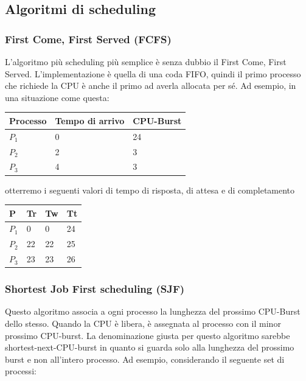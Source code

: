 \documentclass[a4paper]{article}
\begin{document}
\subsection{Algoritmi di scheduling}

\subsubsection{First Come, First Served (FCFS)}
L'algoritmo più scheduling più semplice è senza dubbio il First Come, First Served. L'implementazione è quella di una coda FIFO, quindi il primo processo che richiede la CPU è anche il primo ad averla allocata per sé.\newline
Ad esempio, in una situazione come questa:

\begin{table}[htb]
    \centering
    \label{my-label}
    \begin{tabular}{lll}
        Processo & Tempo di arrivo & CPU-Burst \\ \hline
        $P_1$    & 0               & 24        \\
        $P_2$    & 2               & 3         \\
        $P_3$    & 4               & 3
    \end{tabular}
\end{table}

otterremo i seguenti valori di tempo di risposta, di attesa e di completamento

\begin{table}[htb]
    \centering
    \label{my-label}
    \begin{tabular}{llll}
        P     & Tr & Tw & Tt \\ \hline
        $P_1$ & 0  & 0  & 24 \\
        $P_2$ & 22 & 22 & 25 \\
        $P_3$ & 23 & 23 & 26
    \end{tabular}
\end{table}

\subsubsection{Shortest Job First scheduling (SJF)}
Questo algoritmo associa a ogni processo la lunghezza del prossimo CPU-Burst dello stesso. Quando la CPU è libera, è assegnata al processo con il minor prossimo CPU-burst. La denominazione giusta per questo algoritmo sarebbe shortest-next-CPU-burst in quanto si guarda solo alla lunghezza del prossimo burst e non all'intero processo. \newline
Ad esempio, considerando il seguente set di processi:
\end{document}
